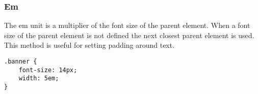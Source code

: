 \documentclass{article}
\begin{document}
%
\subsubsection{Em}
The em unit is a multiplier of the font size of the parent element. When a font
size of the parent element is not defined the next closest parent element is
used.\\
This method is useful for setting padding around text.

\begin{lstlisting}
.banner {
    font-size: 14px;
    width: 5em;
}
\end{lstlisting}

\end{document}
